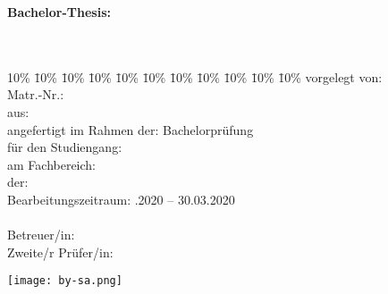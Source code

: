 
\begin{titlepage}
  \begin{center}
  \textbf{Bachelor-Thesis:}\\
  \Huge{\textbf{\myTitel}}\\
  \LARGE{\mySubtitel}\\
  \vspace{0.2cm}
  \end{center}
  \normalsize
  \vfill
  \begin{tabbing}
    10\% \= 10\% \= 10\% \= 10\% \= 10\% \= 10\% \= 10\% \= 10\% \= 10\% \= 10\% \= 10\% \kill
    vorgelegt von: \> \> \> \> \> \> \> \> \> \> \myAutor\\
    Matr.-Nr.: \> \> \> \> \> \> \> \> \> \> \myMatrikelNr\\
    aus: \> \> \> \> \> \> \> \> \> \> \myLocation\\
    angefertigt im Rahmen der: \> \> \> \> \> \> \> \> \> \>  Bachelorprüfung\\%
    für den Studiengang: \> \> \> \> \> \> \> \> \> \> \myStudiengang \\
    am Fachbereich: \> \> \> \> \> \> \> \> \> \> \myFachbereich\\
    der:  \> \> \> \> \> \> \> \> \> \> \myHochschulName \\
    Bearbeitungszeitraum: \> \> \> \> \> \> \> \> \> .2020 -- 30.03.2020 \\
    \\
    Betreuer/in: \> \> \> \> \> \> \> \> \> \> \myBetreuer\\
    Zweite/r Prüfer/in: \> \> \> \> \> \> \> \> \> \> \myZweitpruefer\\
  \end{tabbing}
\texttt{[image: by-sa.png]}
\end{titlepage}
